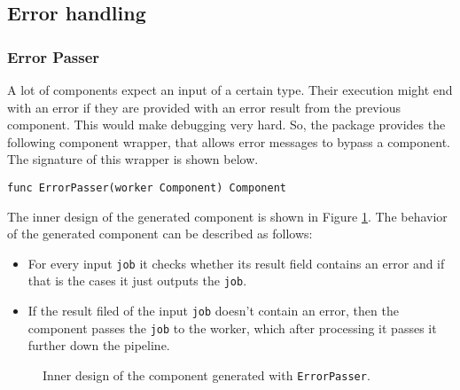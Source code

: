 \subsection{Error handling}

\subsubsection{Error Passer}
A lot of components expect an input of a certain type. Their execution
might end with an error if they are provided with an error result from
the previous component. This would make debugging very hard. So, the 
package provides the following component wrapper, that allows error messages
to bypass a component. The signature of this wrapper is shown below.
\begin{lstlisting}
func ErrorPasser(worker Component) Component
\end{lstlisting}
The inner design of the generated component is shown in Figure 
\ref{fig:errPasserDiag}. The behavior of the generated component 
can be described as follows:
\begin{itemize}
	\item For every input \texttt{job} it checks whether its result field 
          contains an error and if that is the cases it just outputs the 
          \texttt{job}.
	\item If the result filed of the input \texttt{job} doesn't contain 
          an error, then the component passes the \texttt{job} to the worker, 
          which after processing it passes it further down the pipeline.
\end{itemize}

\begin{figure}[h]
\centering
{}
\caption[scale=1.0]{Inner design of the component generated with
  \texttt{ErrorPasser}.}
\label{fig:errPasserDiag}
\end{figure}

